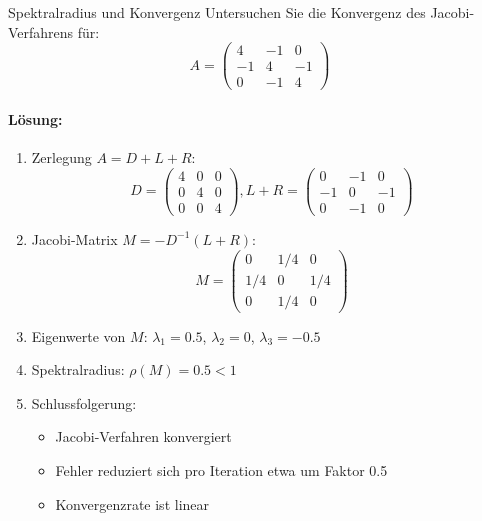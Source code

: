 \begin{example2}{Spektralradius und Konvergenz}
Untersuchen Sie die Konvergenz des Jacobi-Verfahrens für:
$$A = \begin{pmatrix}
4 & -1 & 0 \\
-1 & 4 & -1 \\
0 & -1 & 4
\end{pmatrix}$$

\paragraph{Lösung:}
\begin{enumerate}
    \item Zerlegung $A = D + L + R$:
    $$D = \begin{pmatrix}
    4 & 0 & 0 \\
    0 & 4 & 0 \\
    0 & 0 & 4
    \end{pmatrix}, L+R = \begin{pmatrix}
    0 & -1 & 0 \\
    -1 & 0 & -1 \\
    0 & -1 & 0
    \end{pmatrix}$$
    
    \item Jacobi-Matrix $M = -D^{-1}(L+R)$:
    $$M = \begin{pmatrix}
    0 & 1/4 & 0 \\
    1/4 & 0 & 1/4 \\
    0 & 1/4 & 0
    \end{pmatrix}$$
    
    \item Eigenwerte von $M$: $\lambda_1 = 0.5$, $\lambda_2 = 0$, $\lambda_3 = -0.5$
    
    \item Spektralradius: $\rho(M) = 0.5 < 1$
    
    \item Schlussfolgerung:
    \begin{itemize}
        \item Jacobi-Verfahren konvergiert
        \item Fehler reduziert sich pro Iteration etwa um Faktor 0.5
        \item Konvergenzrate ist linear
    \end{itemize}
\end{enumerate}
\end{example2}

